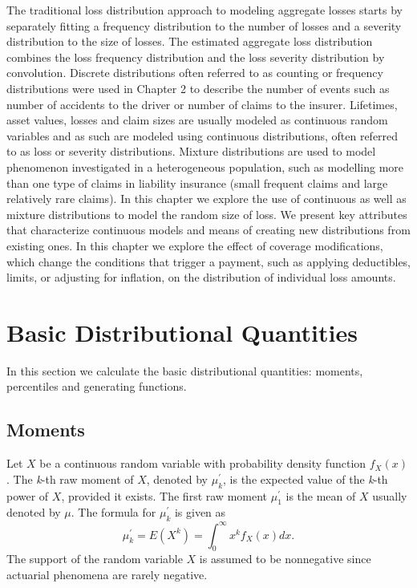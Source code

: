 \documentclass[]{book}
\theoremstyle{definition}
\theoremstyle{definition}
\theoremstyle{definition}
\theoremstyle{remark}
\begin{document}
The traditional loss distribution approach to modeling aggregate losses
starts by separately fitting a frequency distribution to the number of
losses and a severity distribution to the size of losses. The estimated
aggregate loss distribution combines the loss frequency distribution and
the loss severity distribution by convolution. Discrete distributions
often referred to as counting or frequency distributions were used in
Chapter 2 to describe the number of events such as number of accidents
to the driver or number of claims to the insurer. Lifetimes, asset
values, losses and claim sizes are usually modeled as continuous random
variables and as such are modeled using continuous distributions, often
referred to as loss or severity distributions. Mixture distributions are
used to model phenomenon investigated in a heterogeneous population,
such as modelling more than one type of claims in liability insurance
(small frequent claims and large relatively rare claims). In this
chapter we explore the use of continuous as well as mixture
distributions to model the random size of loss. We present key
attributes that characterize continuous models and means of creating new
distributions from existing ones. In this chapter we explore the effect
of coverage modifications, which change the conditions that trigger a
payment, such as applying deductibles, limits, or adjusting for
inflation, on the distribution of individual loss amounts.

\section{Basic Distributional Quantities}\label{BasicQuantities}

In this section we calculate the basic distributional quantities:
moments, percentiles and generating functions.

\subsection{Moments}\label{moments}

Let \(X\) be a continuous random variable with probability density
function \(f_{X}\left( x \right)\). The \emph{k}-th raw moment of \(X\),
denoted by \(\mu_{k}^{\prime}\), is the expected value of the
\emph{k}-th power of \(X\), provided it exists. The first raw moment
\(\mu_{1}^{\prime}\) is the mean of \(X\) usually denoted by \(\mu\).
The formula for \(\mu_{k}^{\prime}\) is given as
\[\mu_{k}^{\prime} = E\left( X^{k} \right) = \int_{0}^{\infty}{x^{k}f_{X}\left( x \right)dx } .\]
The support of the random variable \(X\) is assumed to be nonnegative
since actuarial phenomena are rarely negative.
\end{document}
